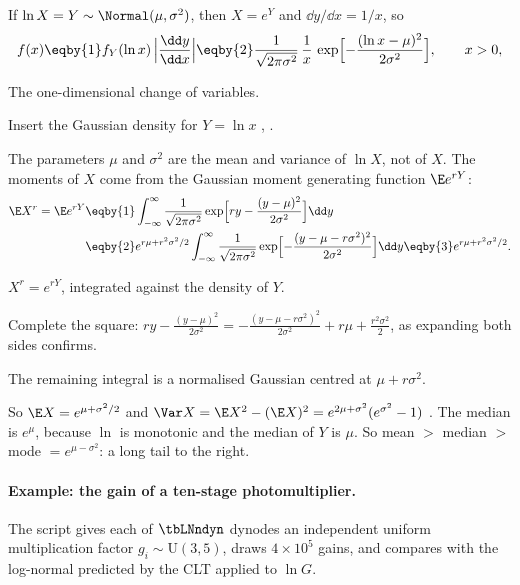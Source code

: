 If $\ln X=Y\sim\Normal(\mu,\sigma^2)$, then $X=e^Y$ and $\dd y/\dd x=1/x$, so
\begin{equation}
  f(x)\eqby{1} f_Y(\ln x)\,\Bigl|\frac{\dd y}{\dd x}\Bigr|\eqby{2}\frac{1}{\sqrt{2\pi\sigma^2}}\,\frac1x\,\exp\Bigl[-\frac{(\ln x-\mu)^2}{2\sigma^2}\Bigr],\qquad x>0,
  \label{2b:eq:lognormal}
\end{equation}
\begin{explain}
  \item The one-dimensional change of variables.
  \item Insert the Gaussian density for $Y=\ln x$ , .
\end{explain}
The parameters $\mu$ and $\sigma^2$ are the mean and variance of $\ln X$, not of $X$. The moments of $X$ come from the Gaussian moment generating function $\E e^{rY}$:
\begin{align}
  \E X^r=\E e^{rY}
  &\eqby{1}\int_{-\infty}^{\infty}\frac{1}{\sqrt{2\pi\sigma^2}}\exp\Bigl[ry-\frac{(y-\mu)^2}{2\sigma^2}\Bigr]\dd y \nonumber\\
  &\eqby{2}e^{r\mu+r^2\sigma^2/2}\int_{-\infty}^{\infty}\frac{1}{\sqrt{2\pi\sigma^2}}\exp\Bigl[-\frac{(y-\mu-r\sigma^2)^2}{2\sigma^2}\Bigr]\dd y
   \eqby{3}e^{r\mu+r^2\sigma^2/2} .
  \label{2b:eq:lognormal-moments}
\end{align}
\begin{explain}
  \item $X^r=e^{rY}$, integrated against the density of $Y$.
  \item Complete the square: $ry-\frac{(y-\mu)^2}{2\sigma^2}=-\frac{(y-\mu-r\sigma^2)^2}{2\sigma^2}+r\mu+\frac{r^2\sigma^2}{2}$, as expanding both sides confirms.
  \item The remaining integral is a normalised Gaussian centred at $\mu+r\sigma^2$.
\end{explain}
So $\E X=e^{\mu+\sigma^2/2}$ and $\Var X=\E X^2-(\E X)^2=e^{2\mu+\sigma^2}(e^{\sigma^2}-1)$ . The median is $e^\mu$, because $\ln$ is monotonic and the median of $Y$ is $\mu$. So mean $>$ median $>$ mode $=e^{\mu-\sigma^2}$: a long tail to the right.

\paragraph{Example: the gain of a ten-stage photomultiplier.} The script gives each of $\tbLNndyn$ dynodes an independent uniform multiplication factor $g_i\sim\mathrm U(3,5)$, draws $4\times10^5$ gains, and compares with the log-normal predicted by the CLT applied to $\ln G$.

